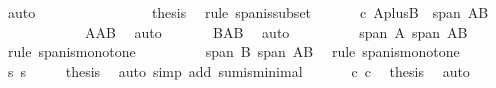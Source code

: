 \begin{isabellebody}
\ auto\isanewline
\ \ \ \ \ \ \isanewline
\ \ \ \ \isamarkupfalse%
\ {}\ {}\ \isamarkupfalse%
\ {\isacharquery}thesis\ \isamarkupfalse%
\ {\isacharparenleft}rule\ span{\isacharunderscore}is{\isacharunderscore}subset{\isacharparenright}\isanewline
\ \ \isamarkupfalse%
\isanewline
\ \ \isamarkupfalse%
\ c{}{\isacharcolon}\ {\isachardoublequoteopen}{\isacharquery}AplusB\ {\isasymsubseteq}\ span\ {\isacharparenleft}A{\isasymunion}B{\isacharparenright}{\isachardoublequoteclose}\ \isanewline
\ \ \isamarkupfalse%
\ {\isacharminus}\ \isanewline
\ \ \ \ \isamarkupfalse%
\ {}{}{\isacharcolon}\ {\isachardoublequoteopen}A{\isasymsubseteq}A{\isasymunion}B{\isachardoublequoteclose}\ \isamarkupfalse%
\ auto\isanewline
\ \ \ \ \isamarkupfalse%
\ {}{}{\isacharcolon}\ {\isachardoublequoteopen}B{\isasymsubseteq}A{\isasymunion}B{\isachardoublequoteclose}\ \isamarkupfalse%
\ auto\isanewline
\ \ \ \ \isamarkupfalse%
\ \ {}{}\ \isamarkupfalse%
\ {}{}{\isacharcolon}{\isachardoublequoteopen}span\ A\ {\isasymsubseteq}span\ {\isacharparenleft}A{\isasymunion}B{\isacharparenright}{\isachardoublequoteclose}\ \isamarkupfalse%
\ {\isacharparenleft}rule\ span{\isacharunderscore}is{\isacharunderscore}monotone{\isacharparenright}\isanewline
\ \ \ \ \isamarkupfalse%
\ \ {}{}\ \isamarkupfalse%
\ {}{}{\isacharcolon}{\isachardoublequoteopen}span\ B\ {\isasymsubseteq}span\ {\isacharparenleft}A{\isasymunion}B{\isacharparenright}{\isachardoublequoteclose}\ \isamarkupfalse%
\ {\isacharparenleft}rule\ span{\isacharunderscore}is{\isacharunderscore}monotone{\isacharparenright}\isanewline
\ \ \ \ \isamarkupfalse%
\ s{}\ s{}\ {}\ {}{}\ {}{}\ \isamarkupfalse%
\ {\isacharquery}thesis\ \isamarkupfalse%
\ {\isacharparenleft}auto\ simp\ add{\isacharcolon}\ sum{\isacharunderscore}is{\isacharunderscore}minimal{\isacharparenright}\isanewline
\ \ \isamarkupfalse%
\isanewline
\ \ \isamarkupfalse%
\ c{}\ c{}\ \isamarkupfalse%
\ {\isacharquery}thesis\ \isamarkupfalse%
\ auto\isanewline
{}\isamarkupfalse%
%
\endisatagproof
{\isafoldproof}%
%
\isadelimproof
\isanewline
%
\endisadelimproof
%
\isadelimtheory
\isanewline
%
\endisadelimtheory
%
\isatagtheory
{}\isamarkupfalse%
%
\endisatagtheory
{\isafoldtheory}%
%
\isadelimtheory
%
\endisadelimtheory
\end{isabellebody}%
